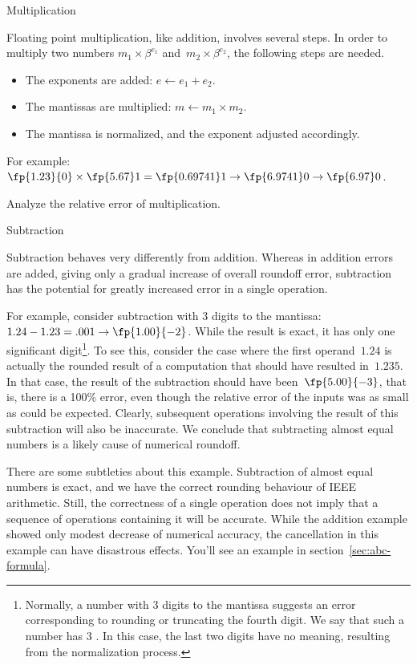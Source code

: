  {Multiplication}

Floating point multiplication, like addition, involves several steps.
In order to multiply two numbers $m_1\times\beta^{e_1}$
and~$m_2\times\beta^{e_2}$, the following steps are needed.
\begin{itemize}
\item The exponents are added: $e\leftarrow e_1+e_2$.
\item The mantissas are multiplied: $m\leftarrow
  m_1\times m_2$.
\item The mantissa is normalized, and the exponent adjusted accordingly.
\end{itemize}

For example: $\fp{1.23}{0}\times\fp{5.67}1=\fp{0.69741}1\rightarrow
\fp{6.9741}0\rightarrow\fp{6.97}0$.

\begin{exercise}
  Analyze the relative error of multiplication.
\end{exercise}

 {Subtraction}
\label{sec:subtraction}

Subtraction behaves very differently from addition. Whereas in
addition errors are added, giving only a gradual increase of overall
roundoff error, subtraction has the potential for greatly increased
error in a single operation. 

For example, consider subtraction with 3 digits to the mantissa:
$1.24-1.23=.001\rightarrow \fp{1.00}{-2}$. While the result is exact,
it has only one significant digit\footnote {Normally, a number with 3
  digits to the mantissa suggests an error corresponding to rounding
  or truncating the fourth digit. We say that such a number has 3
  . In this case, the last two digits have no
  meaning, resulting from the normalization process.}. To see this, consider
the case where the first operand~$1.24$ is actually the rounded result
of a computation that should have resulted in~$1.235$. In that case,
the result of the subtraction should have been~$\fp{5.00}{-3}$, that
is, there is a 100\% error, even though the relative error of the
inputs was as small as could be expected. Clearly, subsequent
operations involving the result of this subtraction will also be
inaccurate.
We conclude that subtracting almost equal numbers is a likely cause of
numerical roundoff.

There are some subtleties about this example. Subtraction of almost
equal numbers is exact, and we have the correct rounding behaviour of
IEEE arithmetic. Still, the correctness of a single operation does not
imply that a sequence of operations containing it will be
accurate. While the addition example showed only modest decrease of
numerical accuracy, the cancellation in this example can have
disastrous effects. You'll see an example in section~\ref{sec:abc-formula}.

